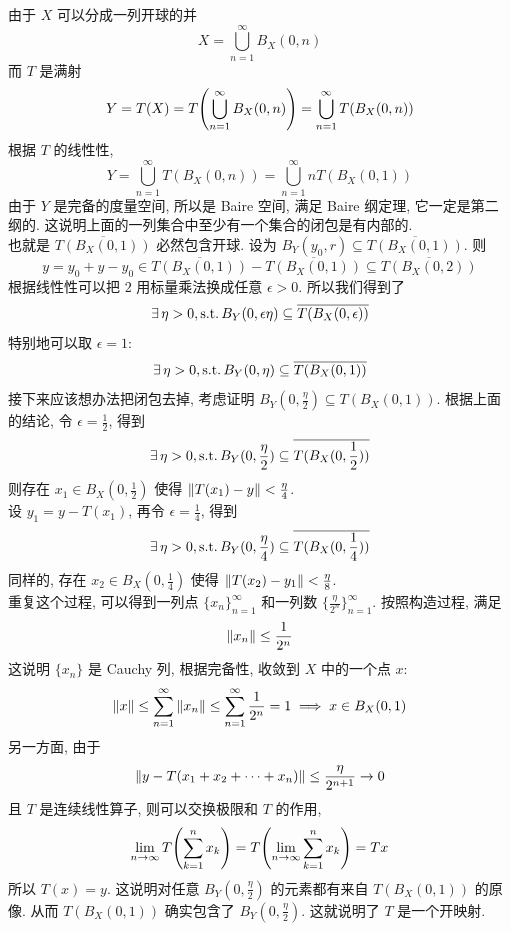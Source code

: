         \begin{prf}
            由于 \(X\) 可以分成一列开球的并
            \[X=\bigcup_{n=1}^{\infty} B_X(0,n)\]
            而 \(T\) 是满射
            \[Y=T(X)=T\qty(\bigcup_{n=1}^{\infty} B_X(0,n))=\bigcup_{n=1}^{\infty} T(B_X(0,n))\]
            根据 \(T\) 的线性性, 
            \[Y=\bigcup_{n=1}^{\infty} T(B_X(0,n))=\bigcup_{n=1}^{\infty} nT(B_X(0,1))\]
            由于 \(Y\) 是完备的度量空间, 所以是 Baire 空间, 满足 Baire 纲定理, 它一定是第二纲的. 这说明上面的一列集合中至少有一个集合的闭包是有内部的.\\
            也就是 \(\overline{T(B_X(0,1))}\) 必然包含开球. 设为 \(B_Y(y_0,r)\subseteq\overline{T(B_X(0,1))} \). 则
            \[y=y_0+y-y_0\in\overline{T(B_X(0,1))}-\overline{T(B_X(0,1))}\subseteq\overline{T(B_X(0,2))}  \]
            根据线性性可以把 \(2\) 用标量乘法换成任意 \(\epsilon>0\). 所以我们得到了
            \[\exists\,\eta>0, \operatorname{\text{s.t.}} B_Y(0,\epsilon\eta)\subseteq\overline{T(B_X(0,\epsilon))} \]
            特别地可以取 \(\epsilon=1\):
            \[\exists\,\eta>0, \operatorname{\text{s.t.}} B_Y(0,\eta)\subseteq\overline{T(B_X(0,1))} \]
            接下来应该想办法把闭包去掉, 考虑证明 \(B_Y(0,\frac{\eta}{2})\subseteq T(B_X(0,1))\). 根据上面的结论, 令 \(\epsilon=\frac{1}{2}\), 得到
            \[\exists\,\eta>0, \operatorname{\text{s.t.}} B_Y(0,\frac{\eta}{2})\subseteq\overline{T(B_X(0,\frac{1}{2}))} \]
            则存在 \(x_1\in B_X(0,\frac{1}{2})\) 使得 \(\norm{T(x_1)-y}<\frac{\eta}{4}\). \\
            设 \(y_1=y-T(x_1)\), 再令 \(\epsilon=\frac{1}{4}\), 得到
            \[\exists\,\eta>0, \operatorname{\text{s.t.}} B_Y(0,\frac{\eta}{4})\subseteq\overline{T(B_X(0,\frac{1}{4}))} \]
            同样的, 存在 \(x_2\in B_X(0,\frac{1}{4})\) 使得 \(\norm{T(x_2)-y_1}<\frac{\eta}{8}\). \\
            重复这个过程, 可以得到一列点 \(\{x_n\}_{n=1}^{\infty}\) 和一列数 \(\{\frac{\eta}{2^n}\}_{n=1}^{\infty}\). 按照构造过程, 满足
            \[\norm{x_n}\leq\frac{1}{2^n}\]
            这说明 \(\{x_n\}\) 是 Cauchy 列, 根据完备性, 收敛到 \(X\) 中的一个点 \(x\):
            \[\norm{x}\leq\sum_{n=1}^{\infty} \norm{x_n} \leq \sum_{n=1}^{\infty} \frac{1}{2^n} = 1\implies x\in B_X(0,1) \]
            另一方面, 由于
            \[\norm{y-T(x_1+x_2+\cdots+x_n)}\leq\frac{\eta}{2^{n+1}}\to 0\]
            且 \(T\) 是连续线性算子, 则可以交换极限和 \(T\) 的作用,
            \[\lim_{n\to\infty}T\qty(\sum_{k=1}^n x_k)=T\qty(\lim_{n\to\infty}\sum_{k=1}^n x_k)=Tx\]
            所以 \(T(x)=y\). 这说明对任意 \(B_Y(0,\frac{\eta}{2})\) 的元素都有来自 \(T(B_X(0,1))\) 的原像. 从而 \(T(B_X(0,1))\) 确实包含了 \(B_Y(0,\frac{\eta}{2})\). 这就说明了 \(T\) 是一个开映射.
        \end{prf}

